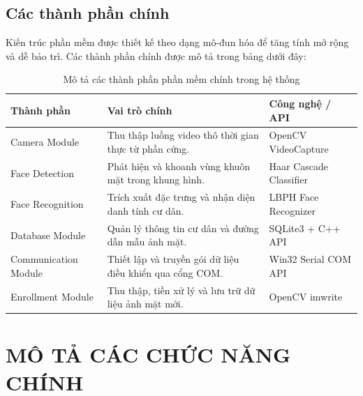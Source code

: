 \documentclass[12pt,a4paper]{article}
\begin{document}
\subsection{Các thành phần chính}
Kiến trúc phần mềm được thiết kế theo dạng mô-đun hóa để tăng tính mở rộng và dễ bảo trì. Các thành phần chính được mô tả trong bảng dưới đây:
\begin{table}[H]
    \centering
    \begin{tabular}{|l|p{7cm}|l|}
        \hline
        \textbf{Thành phần} & \textbf{Vai trò chính} & \textbf{Công nghệ / API} \\ \hline
        Camera Module & Thu thập luồng video thô thời gian thực từ phần cứng. & OpenCV VideoCapture \\ \hline
        Face Detection & Phát hiện và khoanh vùng khuôn mặt trong khung hình. & Haar Cascade Classifier \\ \hline
        Face Recognition & Trích xuất đặc trưng và nhận diện danh tính cư dân. & LBPH Face Recognizer \\ \hline
        Database Module & Quản lý thông tin cư dân và đường dẫn mẫu ảnh mặt. & SQLite3 + C++ API \\ \hline
        Communication Module & Thiết lập và truyền gói dữ liệu điều khiển qua cổng COM. & Win32 Serial COM API \\ \hline
        Enrollment Module & Thu thập, tiền xử lý và lưu trữ dữ liệu ảnh mặt mới. & OpenCV imwrite \\ \hline
    \end{tabular}
    \caption{Mô tả các thành phần phần mềm chính trong hệ thống}
    \label{tab:components}
\end{table}

\newpage

\section{MÔ TẢ CÁC CHỨC NĂNG CHÍNH}
\end{document}
